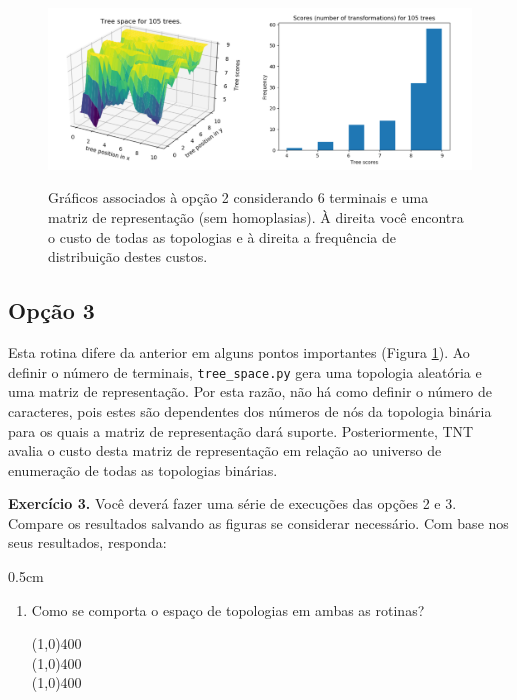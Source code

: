\begin{refsection}
  \begin{figure}[H]
  \centering
       \centering
      {\includegraphics[scale=0.65]{figures/tut3/opcao_3_6_terminals_24_characters.pdf}}
      {\caption[\textit{\textit{Structured space} }]{Gráficos associados à opção 2 considerando 6 terminais e uma matriz de representação (sem homoplasias). À direita você encontra o custo de todas as topologias e à direita a frequência de distribuição destes custos.}\label{tut3:fig:struc}}
  \end{figure}



\subsection{Opção 3}\label{tut3:subs:struc}
Esta rotina difere da anterior em alguns pontos importantes (Figura \ref{tut3:fig:struc}). Ao definir o número de terminais, \texttt{tree\_space.py} gera uma topologia aleatória e uma matriz de representação. Por esta razão, não há como definir o número de caracteres, pois estes são dependentes dos números de nós da topologia binária para os quais a matriz de representação dará suporte. Posteriormente, TNT avalia o custo desta matriz de representação em relação ao universo de enumeração de todas as topologias binárias. \\

\begin{blackBlock}{\textbf{Exercício 3.}}\label{tut3:ex:3.\arabic{ex}}
	Você deverá fazer uma série de execuções das opções 2 e 3. Compare os resultados salvando as figuras se considerar necessário. Com base nos seus resultados, responda:
\begin {myindentpar}{0.5cm}
\begin{enumerate}[\itshape i.]
 \item{Como se comporta o espaço de topologias em ambas as rotinas?}\label{tut3:ex3}\\
  \begin{center}
  \line(1,0){400}\\
  \line(1,0){400}\\
  \line(1,0){400}\\
  \end{center}


\end{enumerate}
\end{myindentpar}
\end{blackBlock}
\end{refsection}
